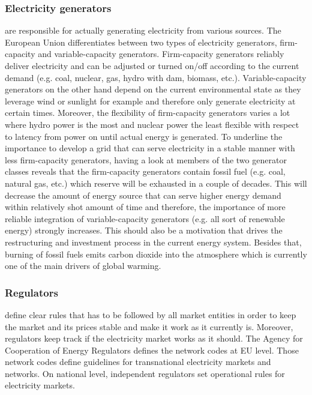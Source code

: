 \documentclass[runningheads]{llncs}
\begin{document}
\subsubsection{Electricity generators} are responsible for actually generating electricity from various sources. The European Union differentiates between two types of electricity generators, firm-capacity and variable-capacity generators. Firm-capacity generators reliably deliver electricity and can be adjusted or turned on/off according to the current demand (e.g. coal, nuclear, gas, hydro with dam, biomass, etc.). Variable-capacity generators on the other hand depend on the current environmental state as they leverage wind or sunlight for example and therefore only generate electricity at certain times.  Moreover, the flexibility of firm-capacity generators varies a lot where hydro power is the most and nuclear power the least flexible with respect to latency from power on until actual energy is generated.
To underline the importance to develop a grid that can serve electricity in a stable manner with less firm-capacity generators, having a look at members of the two generator classes reveals that the firm-capacity generators contain fossil fuel (e.g. coal, natural gas, etc.) which reserve will be exhausted in a couple of decades. This will decrease the amount of energy source that can serve higher energy demand within relatively shot amount of time and therefore, the importance of more reliable integration of variable-capacity generators (e.g. all sort of renewable energy) strongly increases. This should also be a motivation that drives the restructuring and investment process in the current energy system. Besides that, burning of fossil fuels emits carbon dioxide into the atmosphere which is currently one of the main drivers of global warming. \cite{eu_energy_market}

\subsubsection{Regulators} define clear rules that has to be followed by all market entities in order to keep the market and its prices stable and make it work as it currently is. Moreover, regulators keep track if the electricity market works as it should. The Agency for Cooperation of Energy Regulators defines the network codes at EU level. Those network codes define guidelines for transnational electricity markets and networks. On national level, independent regulators set operational rules for electricity markets.
\end{document}
